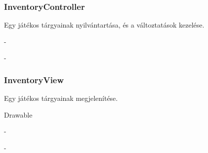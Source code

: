 \subsubsection{InventoryController}
\begin{class-template-responsibility}
    Egy játékos tárgyainak nyilvántartása, és a változtatások kezelése.
\end{class-template-responsibility}
\begin{class-template-interface}
    -
\end{class-template-interface}
\begin{class-template-baseclass}
    -
\end{class-template-baseclass}
\begin{class-template-attribute}
\end{class-template-attribute}
\begin{class-template-method}
\end{class-template-method}

\subsubsection{InventoryView}
\begin{class-template-responsibility}
    Egy játékos tárgyainak megjelenítése.
\end{class-template-responsibility}
\begin{class-template-interface}
    Drawable
\end{class-template-interface}
\begin{class-template-baseclass}
    -
\end{class-template-baseclass}
\begin{class-template-attribute}
    -
\end{class-template-attribute}
\begin{class-template-method}
\end{class-template-method}

